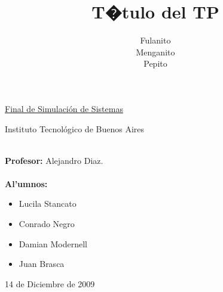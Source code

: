 \documentclass{article}
\title{T�tulo del TP}
\author{Fulanito\\Menganito\\Pepito}
\numberwithin{equation}{section}
\numberwithin{figure}{section}
\numberwithin{table}{section}
\begin{document}
\Large

%
%
\pagestyle{fancy}
\renewcommand{\sectionmark}[1]{\markboth{}{\thesection\ \ #1}}
\renewcommand{\footrulewidth}{0.6pt} %

\chead{}
\rhead{\rightmark}
\lfoot{}
\cfoot{\thepage}

%
%
\begin{titlepage}

%
%
%
	
	\begin{figure}
\begin{center}
	\end{center}
\end{figure}

\vspace{3cm}
%
	\begin{center}
		\underline{\Huge{Final de Simulaci\'on de Sistemas}}\\
\vspace{1cm}
	    \huge{Instituto Tecnol\'ogico de Buenos Aires
		\vspace{1cm}
		
}	\end{center}
	\vspace{1.5cm}
%
%


\noindent \huge{{\bf}
\\
\Large{{\bf Profesor:}} Alejandro Diaz. \\
\\
  \Large{{\bf Al'umnos:}}
\begin{itemize}
 \item Lucila Stancato \\
\item Conrado Negro \\
\item Damian Modernell \\
\item Juan Brasca 

\end{itemize}
 

	\vfill
  \begin{center}
		\huge{14 de Diciembre de 2009}
	\end{center}
}
\end{titlepage}
\end{document}
